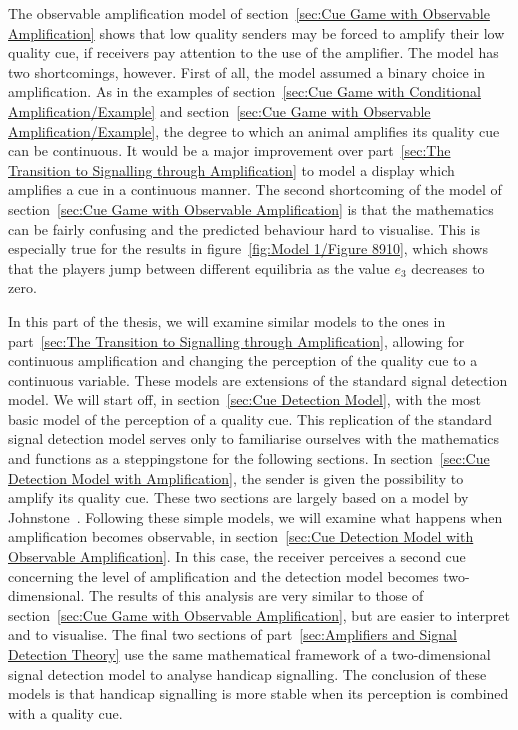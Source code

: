 \documentclass[a4paper,12pt]{article}
\numberwithin{equation}{section}
\begin{document}
The observable amplification model of section~\ref{sec:Cue Game with Observable Amplification} shows that low quality senders may be forced to amplify their low quality cue, if receivers pay attention to the use of the amplifier. The model has two shortcomings, however. First of all, the model assumed a binary choice in amplification. As in the examples of section~\ref{sec:Cue Game with Conditional Amplification/Example} and section~\ref{sec:Cue Game with Observable Amplification/Example}, the degree to which an animal amplifies its quality cue can be continuous. It would be a major improvement over part~\ref{sec:The Transition to Signalling through Amplification} to model a display which amplifies a cue in a continuous manner. The second shortcoming of the model of section~\ref{sec:Cue Game with Observable Amplification} is that the mathematics can be fairly confusing and the predicted behaviour hard to visualise. This is especially true for the results in figure~\ref{fig:Model 1/Figure 8910}, which shows that the players jump between different equilibria as the value $e_{3}$ decreases to zero.

In this part of the thesis, we will examine similar models to the ones in part~\ref{sec:The Transition to Signalling through Amplification}, allowing for continuous amplification and changing the perception of the quality cue to a continuous variable. These models are extensions of the standard signal detection model. We will start off, in section~\ref{sec:Cue Detection Model}, with the most basic model of the perception of a quality cue. This replication of the standard signal detection model serves only to familiarise ourselves with the mathematics and functions as a steppingstone for the following sections. In section~\ref{sec:Cue Detection Model with Amplification}, the sender is given the possibility to amplify its quality cue. These two sections are largely based on a model by Johnstone~\cite{Johnstone1997}. Following these simple models, we will examine what happens when amplification becomes observable, in section~\ref{sec:Cue Detection Model with Observable Amplification}. In this case, the receiver perceives a second cue concerning the level of amplification and the detection model becomes two-dimensional. The results of this analysis are very similar to those of section~\ref{sec:Cue Game with Observable Amplification}, but are easier to interpret and to visualise. The final two sections of part~\ref{sec:Amplifiers and Signal Detection Theory} use the same mathematical framework of a two-dimensional signal detection model to analyse handicap signalling. The conclusion of these models is that handicap signalling is more stable when its perception is combined with a quality cue.
\end{document}

